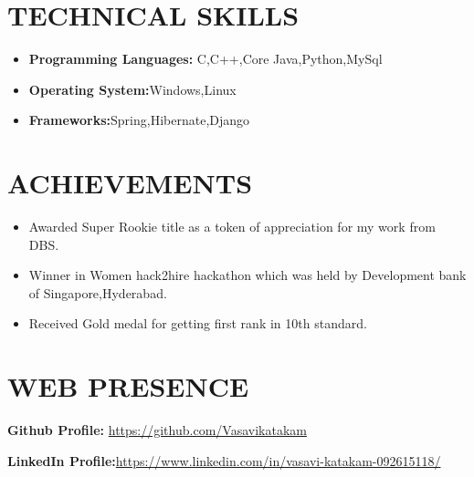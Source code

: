 \documentclass[12pt,a4paper,sans]{moderncv}        %
\begin{document}
\begin{itemize}
\section{TECHNICAL SKILLS}

\vspace{6pt}

\begin{itemize}

\item \textbf{Programming Languages:} C,C++,Core Java,Python,MySql
\vspace{3pt}
\item \textbf{Operating System:}{Windows,Linux}
\vspace{3pt}
\item\textbf{Frameworks:}{Spring,Hibernate,Django}
\end{itemize}

\section{ACHIEVEMENTS}
\vspace{3pt}

\begin{itemize}
\item{Awarded Super Rookie title as a token of appreciation for my work from DBS.}
\item{Winner in Women hack2hire hackathon which was held by Development bank of Singapore,Hyderabad.}
\item{Received Gold medal for getting first rank in 10th standard.}



\end{itemize}

\section{WEB PRESENCE}

\vspace{6pt}



 \textbf{Github Profile:} 
{\color{blue}\url{https://github.com/Vasavikatakam}}
\vspace{3pt}

\textbf{LinkedIn Profile:}{\color{blue}\url{https://www.linkedin.com/in/vasavi-katakam-092615118/}}






\nocite{*}



\end{itemize}
\end{document}
